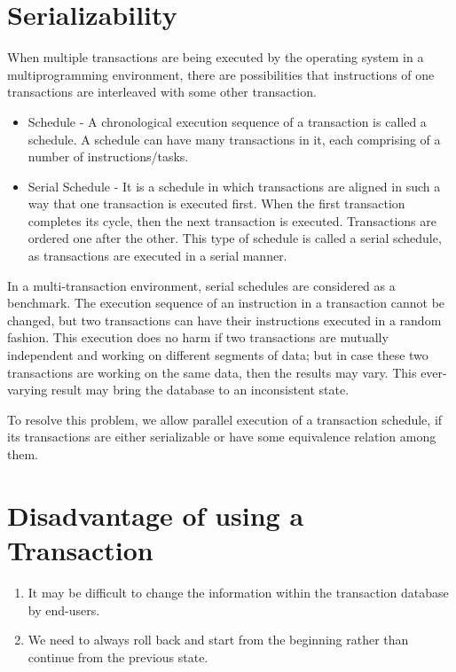 \documentclass{article}
\begin{document}
\section{Serializability}

When multiple transactions are being executed by the operating system in a multiprogramming environment, there are possibilities that instructions of one transactions are interleaved with some other transaction.

\begin{itemize}


\item Schedule - A chronological execution sequence of a transaction is called a schedule. A schedule can have many transactions in it, each comprising of a number of instructions/tasks.

\item Serial Schedule - It is a schedule in which transactions are aligned in such a way that one transaction is executed first. When the first transaction completes its cycle, then the next transaction is executed. Transactions are ordered one after the other. This type of schedule is called a serial schedule, as transactions are executed in a serial manner.

\end{itemize}

In a multi-transaction environment, serial schedules are considered as a benchmark. The execution sequence of an instruction in a transaction cannot be changed, but two transactions can have their instructions executed in a random fashion. This execution does no harm if two transactions are mutually independent and working on different segments of data; but in case these two transactions are working on the same data, then the results may vary. This ever-varying result may bring the database to an inconsistent state.

To resolve this problem, we allow parallel execution of a transaction schedule, if its transactions are either serializable or have some equivalence relation among them.

\section{Disadvantage of using a Transaction} 

\begin{enumerate}

\item It may be difficult to change the information within the transaction database by end-users.
\item We need to always roll back and start from the beginning rather than continue from the previous state.

\end{enumerate}
\end{document}
